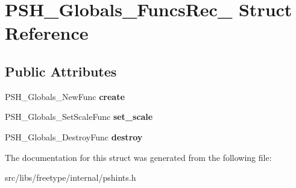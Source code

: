 \hypertarget{struct_p_s_h___globals___funcs_rec__}{
\section{PSH\_\-Globals\_\-FuncsRec\_\- Struct Reference}
\label{struct_p_s_h___globals___funcs_rec__}
}
\subsection*{Public Attributes}
\begin{DoxyCompactItemize}
\item 
\hypertarget{struct_p_s_h___globals___funcs_rec___ac136cec55ea33a2e3b60ffdad20f5420}{
PSH\_\-Globals\_\-NewFunc {\bfseries create}}
\label{struct_p_s_h___globals___funcs_rec___ac136cec55ea33a2e3b60ffdad20f5420}

\item 
\hypertarget{struct_p_s_h___globals___funcs_rec___a9c97456d3f521cb1091f08c2bda27332}{
PSH\_\-Globals\_\-SetScaleFunc {\bfseries set\_\-scale}}
\label{struct_p_s_h___globals___funcs_rec___a9c97456d3f521cb1091f08c2bda27332}

\item 
\hypertarget{struct_p_s_h___globals___funcs_rec___aebb5534f8305a189b09adfebff4f57ba}{
PSH\_\-Globals\_\-DestroyFunc {\bfseries destroy}}
\label{struct_p_s_h___globals___funcs_rec___aebb5534f8305a189b09adfebff4f57ba}

\end{DoxyCompactItemize}


The documentation for this struct was generated from the following file:\begin{DoxyCompactItemize}
\item 
src/libs/freetype/internal/pshints.h\end{DoxyCompactItemize}

